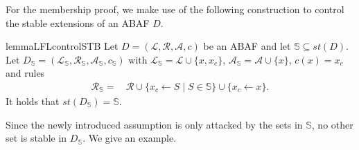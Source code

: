 \documentclass[letterpaper]{article} %
\newcommand{\stb}{\textit{st}}
\newcommand{\asm}{\ensuremath{\mathcal{A}}}
\newcommand{\atoms}{\mathcal{L}}
\newcommand{\ruleset}{\mathcal{R}}
\newcommand{\assumptions}{\mathcal{A}}
\newcommand{\contra}{c}
\newcommand{\contrary}[1]{c(#1)}
\newcommand{\contraryempty}{c}
\newcommand{\ABAdef}{D=(\atoms,\ruleset,\assumptions,\contra)}
\newcommand{\setS}{\mathbb{S}}
\begin{document}
For the membership proof, we make use of the following construction to control the stable extensions of an ABAF $D$.{}
\begin{restatable}{lemma}{LFLcontrolSTB}
    \label{lem:lfl-construction new}
    Let $\ABAdef$ be an ABAF and let $\setS\subseteq \stb(D)$. 
    Let $D_\setS=(\mathcal{L}_\setS,\mathcal{R}_\setS,\mathcal{A}_\setS,\contraryempty_\setS)$ with $\mathcal{L}_\setS = \mathcal L \cup \{x,x_c\}$, $\mathcal{A}_\setS= \asm \cup \{x\} $, $\contrary{x}=x_c$ and rules 
\begin{align*}
    \mathcal{R}_\setS = &\, \mathcal{R}\cup \{ x_c \gets S\mid S \in \setS\} \cup \{x_c\gets x\}.
\end{align*}
It holds that $\stb(D_\setS)=\setS$.
\end{restatable}
Since the newly introduced assumption is only attacked by the sets in $\setS$, no other set is stable in $D_\setS$. 
We give an example.%
\end{document}

